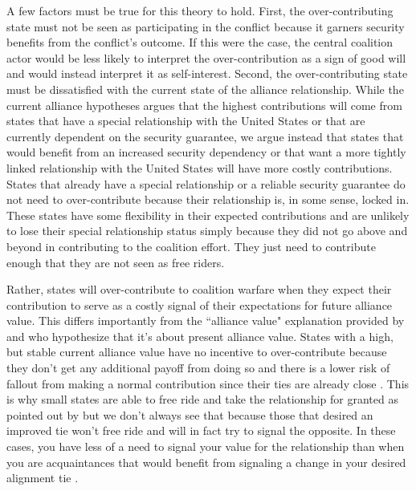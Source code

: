 \documentclass[12pt,letterpaper]{article}
\begin{document}
		A few factors must be true for this theory to hold. First, the over-contributing state must not be seen as participating in the conflict because it garners security benefits from the conflict's outcome. If this were the case, the central coalition actor would be less likely to interpret the over-contribution as a sign of good will and would instead interpret it as self-interest. Second, the over-contributing state must be dissatisfied with the current state of the alliance relationship. While the current alliance hypotheses argues that the highest contributions will come from states that have a special relationship with the United States or that are currently dependent on the security guarantee, we argue instead that states that would benefit from an increased security dependency or that want a more tightly linked relationship with the United States will have more costly contributions. States that already have a special relationship or a reliable security guarantee do not need to over-contribute because their relationship is, in some sense, locked in. These states have some flexibility in their expected contributions and are unlikely to lose their special relationship status simply because they did not go above and beyond in contributing to the coalition effort. They just need to contribute enough that they are not seen as free riders.

		Rather, states will over-contribute to coalition warfare when they expect their contribution to serve as a costly signal of their expectations for future alliance value. This differs importantly from the ``alliance value" explanation provided by \citet{davidson_americaallieswar_2011} and \citet{massie_democraticalliesfollowership_2016} who hypothesize that it's about present alliance value. States with a high, but stable current alliance value have no incentive to over-contribute because they don't get any additional payoff from doing so and there is a lower risk of fallout from making a normal contribution since their ties are already close \citep{davidson_headingexitsdemocratic_2014}. This is why small states are able to free ride and take the relationship for granted as pointed out by \citet{keohane_biginfluencesmall_1971} but we don't always see that because those that desired an improved tie won't free ride and will in fact try to signal the opposite. In these cases, you have less of a need to signal your value for the relationship than when you are acquaintances that would benefit from signaling a change in your desired alignment tie \citep{gartzke_contractsfriendsalliances_2012, gibler_priorcommitmentscompatible_2004}.
\end{document}
